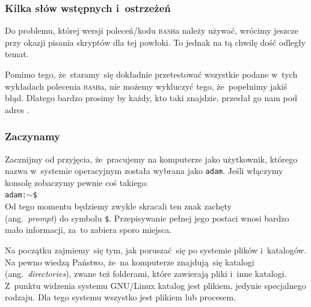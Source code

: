 \documentclass[10pt,t]{beamer}
\begin{document}
\begin{frame}
  \frametitle{Kilka słów wstępnych i~ostrzeżeń}


  Do problemu, której wersji poleceń/kodu \textsc{bash}a należy używać,
  wrócimy jeszcze przy okazji pisania skryptów dla tej powłoki. To jednak
  na tą chwilę dość odległy temat.

  Pomimo tego, że~staramy~się dokładnie przetestować wszystkie podane
  w~tych wykładach polecenia \textsc{bash}a, nie możemy wykluczyć tego,
  że~popełnimy jakiś błąd. Dlatego bardzo prosimy by każdy, kto taki
  znajdzie, przesłał go nam pod adres \email.

\end{frame}





\begin{frame}
  \frametitle{Zaczynamy}


  Zacznijmy od przyjęcia, że~pracujemy na komputerze jako użytkownik,
  którego nazwa w~systemie operacyjnym została wybrana jako \texttt{adam}.
  Jeśli włączymy konsolę zobaczymy pewnie coś takiego: \\
  \texttt{adam:$\sim$\$} \\
  Od tego momentu będziemy zwykle skracali ten znak zachęty \\
  (ang.~\textit{prompt}) do symbolu \texttt{\$}. Przepisywanie pełnej jego
  postaci wnosi bardzo mało informacji, za~to zabiera sporo miejsca.

  Na początku zajmiemy~się tym, jak poruszać~się po systemie plików
  i~katalogów. Na pewno wiedzą Państwo, że~na komputerze znajdują~się
  katalogi (ang.~\textit{directories}), zwane też folderami, które zawierają
  pliki i~inne katalogi. Z~punktu widzenia systemu GNU/Linux
  katalog jest plikiem, jedynie specjalnego rodzaju. Dla tego systemu
  wszystko jest plikiem lub procesem.

\end{frame}
\end{document}
